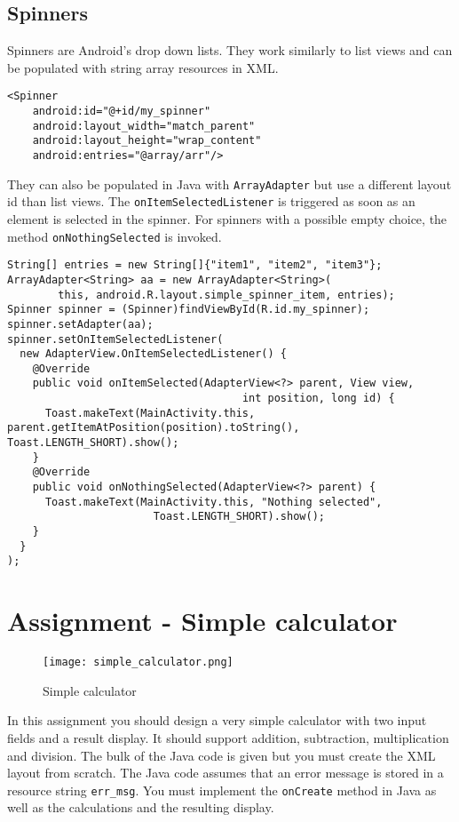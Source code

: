 \subsection{Spinners}
Spinners are Android's drop down lists. They work similarly to list views and can be populated with string array resources in XML.

\begin{lstlisting}[style=A_XML, caption={Spinner declaration}, label={listing:spinxml}]
<Spinner
    android:id="@+id/my_spinner"
    android:layout_width="match_parent"
    android:layout_height="wrap_content"
    android:entries="@array/arr"/>
\end{lstlisting}

They can also be populated in Java with \texttt{ArrayAdapter} but use a different layout id than list views. The \texttt{onItemSelectedListener} is triggered as soon as an element is selected in the spinner. For spinners with a possible empty choice, the method \texttt{onNothingSelected} is invoked.

\begin{lstlisting}[style=A_Java, caption={Spinner population and event}, label={listing:spinpopev}]
String[] entries = new String[]{"item1", "item2", "item3"};
ArrayAdapter<String> aa = new ArrayAdapter<String>(
        this, android.R.layout.simple_spinner_item, entries);
Spinner spinner = (Spinner)findViewById(R.id.my_spinner);
spinner.setAdapter(aa);
spinner.setOnItemSelectedListener(
  new AdapterView.OnItemSelectedListener() {
    @Override
    public void onItemSelected(AdapterView<?> parent, View view,
                                     int position, long id) {
      Toast.makeText(MainActivity.this, parent.getItemAtPosition(position).toString(), Toast.LENGTH_SHORT).show();
    }
    @Override
    public void onNothingSelected(AdapterView<?> parent) {
      Toast.makeText(MainActivity.this, "Nothing selected",
                       Toast.LENGTH_SHORT).show();
    }
  }
);
\end{lstlisting}


\section{Assignment - Simple calculator}
\begin{minipage}{0.45\textwidth}
\begin{figure}[H]
\centering
\texttt{[image: simple\_calculator.png]}
\caption{Simple calculator}
\label{fig:simcal}
\end{figure}
\end{minipage}
\hfill
\begin{minipage}{0.475\textwidth}
In this assignment you should design a very simple calculator with two input fields and a result display. It should support addition, subtraction, multiplication and division. The bulk of the Java code is given but you must create the XML layout from scratch. The Java code assumes that an error message is stored in a resource string \texttt{err\_msg}. You must implement the \texttt{onCreate} method in Java as well as the calculations and the resulting display.
\end{minipage}

